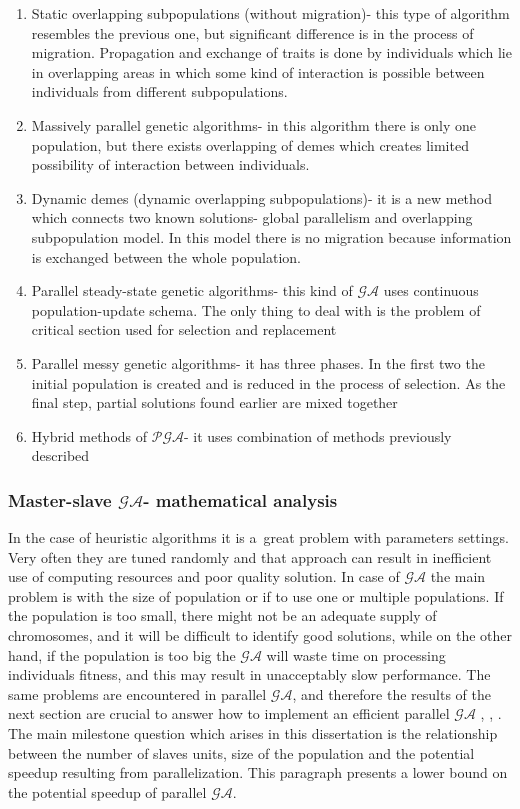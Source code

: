 \begin{enumerate}
	\item Static overlapping subpopulations (without migration)- this type of
		algorithm resembles the previous one, but significant difference is in
		the process of migration. Propagation and exchange of traits is done by
		individuals which lie in overlapping areas in which some kind of
		interaction is possible between individuals from different
		subpopulations. 
	\item Massively parallel genetic algorithms- in this algorithm there is only
		one population, but there exists overlapping of demes which creates
		limited possibility of interaction between individuals. 
	\item Dynamic demes (dynamic overlapping subpopulations)- it is a new method
		which connects two known solutions- global parallelism and overlapping
		subpopulation model. In this model there is no migration because
		information is exchanged between the whole population. 
	\item Parallel steady-state genetic algorithms- this kind of $\mathcal{GA}$ uses
		continuous population-update schema. The only thing to deal with is the
		problem of critical section used for selection and replacement
	\item Parallel messy genetic algorithms- it has three phases. In the first
		two the initial population is created and is reduced in the process of
		selection. As the final step, partial solutions found earlier are mixed
		together
	\item Hybrid methods of $\mathcal{PGA}$- it uses combination of methods
		previously described 
\end{enumerate}


\subsubsection{Master-slave $\mathcal{GA}$- mathematical analysis}
\label{cha:PgamathematicTheory}
In the case of heuristic algorithms it is a~great problem with parameters
settings. Very often they are tuned randomly and that approach can result in
inefficient use of computing resources and poor quality solution. In case of
$\mathcal{GA}$ the main problem is with the size of population or if to use one or
multiple populations. If the population is too small, there might
not be an adequate supply of chromosomes, and it will be difficult to identify good
solutions, while on the other hand, if the population is too big the $\mathcal{GA}$ will waste
time on processing individuals fitness, and this may result in unacceptably
slow performance. The same problems are encountered in parallel $\mathcal{GA}$, and
therefore the results of the next section are crucial to answer how
to implement an efficient parallel $\mathcal{GA}$ \cite{bib1}, \cite{bib18},
\cite{bib19}. The main milestone question 
which arises in this dissertation is the relationship between the number of
slaves units, size of the population and the potential speedup resulting from parallelization.
This paragraph presents a lower bound on the potential speedup of parallel
$\mathcal{GA}$.


